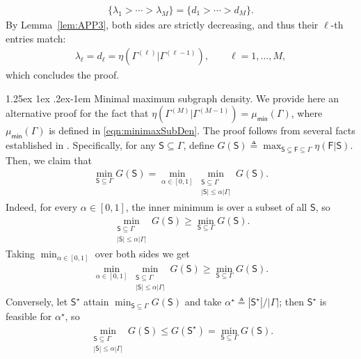 \documentclass[12pt]{article}
\makeatletter
\newcommand{\s}[1]{\mathsf{#1}}
\renewcommand{\paragraph}{%
  \@startsection{paragraph}{4}%
  {\z@}{1.25ex \@plus 1ex \@minus .2ex}{-1em}%
  {\normalfont\normalsize\bfseries}%
}
\makeatother
\begin{document}
\begin{align}
\{\lambda_1>\cdots>\lambda_M\}=\{d_1>\cdots>d_M\}.
\end{align}
By Lemma~\ref{lem:APP3}, both sides are strictly decreasing, and thus their $\ell$-th entries match:
\begin{align}
\lambda_\ell=d_\ell=\eta(\Gamma^{(\ell)}\vert\Gamma^{(\ell-1)}),\qquad \ell=1,\dots,M,
\end{align}
which concludes the proof.

\paragraph{Minimal maximum subgraph density.} We provide here an alternative proof for the fact that $\eta(\Gamma^{(M)}\vert \Gamma^{(M-1)})=\mu_{\s{min}}(\Gamma)$, where $\mu_{\s{min}}(\Gamma)$ is defined in \eqref{eqn:minimaxSubDen}. The proof follows from several facts established in \cite{LeePerniceRajaramanZadik2025}. Specifically, for any $\s{S}\subseteq\Gamma$, define $G(\s{S})\triangleq\max_{\s{S}\subsetneq\s{F}\subseteq\Gamma}\eta(\s{F}\vert\s{S})$. Then, we claim that
\begin{align}
\min_{\s{S}\subseteq \Gamma}G(\s{S})=
\min_{\alpha\in[0,1]}\min_{\substack{\s{S}\subseteq\Gamma\\ |\s{S}|\leq \alpha|\Gamma|}} G(\s{S}).
\end{align}
Indeed, for every $\alpha\in[0,1]$, the inner minimum is over a subset of all $\s{S}$, so
\begin{align}
\min_{\substack{\s{S}\subseteq\Gamma\\ |\s{S}|\leq \alpha|\Gamma|}} G(\s{S})\geq \min_{\s{S}\subseteq \Gamma}G(\s{S}).
\end{align}
Taking $\min_{\alpha\in[0,1]}$ over both sides we get
\begin{align}
\min_{\alpha\in[0,1]}\min_{\substack{\s{S}\subseteq\Gamma\\ |\s{S}|\leq \alpha|\Gamma|}} G(\s{S})\geq \min_{\s{S}\subseteq \Gamma}G(\s{S}).
\end{align}
Conversely, let $\s{S}^\star$ attain $\min_{\s{S}\subseteq \Gamma}G(\s{S})$ and take
$\alpha^\star\triangleq|\s{S}^\star|/|\Gamma|$; then $\s{S}^\star$ is feasible for $\alpha^\star$, so
\begin{align}
\min_{\substack{\s{S}\subseteq\Gamma\\ |\s{S}|\leq \alpha|\Gamma|}} G(\s{S})\leq G(\s{S}^\star)=\min_{\s{S}\subseteq \Gamma}G(\s{S}).
\end{align}
\end{document}
